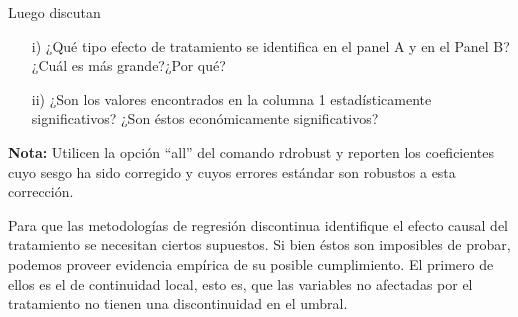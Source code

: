 \documentclass[a4paper]{article}
\begin{document}
\begin{itemize}
Luego discutan

\begin{itemize}
    \item[i)] ¿Qué tipo efecto de tratamiento se identifica en el panel A y en el Panel B? ¿Cuál es más grande?¿Por qué?
    
    \item[ii)] ¿Son los valores encontrados en la columna 1 estadísticamente significativos? ¿Son éstos económicamente significativos?
\end{itemize}

\textbf{Nota:} Utilicen la opción ``all'' del comando rdrobust y reporten los coeficientes cuyo sesgo ha sido
corregido y cuyos errores estándar son robustos a esta corrección.\\


\end{itemize}

Para que las metodologías de regresión discontinua
identifique el efecto causal del tratamiento se necesitan ciertos supuestos. Si bien éstos son imposibles de probar, podemos
proveer evidencia empírica de su posible cumplimiento. El primero de ellos es el de continuidad local, esto es, que las variables no afectadas por el tratamiento no tienen una discontinuidad en el umbral.
\end{document}

